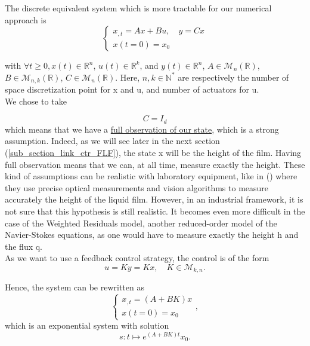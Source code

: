 \documentclass[12pt]{article}
\begin{document}
The discrete equivalent system which is more tractable for our numerical approach is 
\begin{equation}\label{Ctrl_framework_discrete}
    \left\{ 
    \begin{aligned}
        x_{,t} = Ax+Bu, \quad y=Cx\\
        x(t=0) = x_0
    \end{aligned}
    \right.
\end{equation}

with $\forall t\geq 0, x(t)\in \mathbb{R}^n$, $u(t)\in \mathbb{R}^k$, and $y(t) \in \mathbb{R}^n$, $A \in \mathcal{M}_{n}(\mathbb{R})$, $B \in \mathcal{M}_{n, k}(\mathbb{R})$, $C \in \mathcal{M}_{n}(\mathbb{R})$. Here, $n,k \in  \mathbb{N}^*$ are respectively the number of space discretization point for x and u, and number of actuators for u. \\

We chose to take 

\begin{equation}
    C = I_d
\end{equation}
which means that we have a \underline{ full observation of our state}, which is a strong assumption. Indeed, as we will see later in the next section (\ref{sub_section_link_ctr_FLF}), the state x will be the height of the film. Having full observation means that we can, at all time, measure exactly the height. These kind of assumptions can be realistic with laboratory equipment, like in (\cite{experimental_paper}) where they use precise optical measurements and vision algorithms to measure accurately the height of the liquid film. However, in an industrial framework, it is not sure that this hypothesis is still realistic. It becomes even more difficult in the case of the Weighted Residuals model, another reduced-order model of the Navier-Stokes equations, as one would have to measure exactly the height h and the flux q. 
\\

As we want to use a feedback control strategy, the control is of the form 
\begin{equation}
    u = Ky = Kx, \quad K \in \mathcal{M}_{k,n}.
\end{equation}

Hence, the system can be rewritten as 
\begin{equation}\label{expo_ctrl_system}
    \left\{
    \begin{aligned}
        x_{,t}=(A+BK)x \\
        x(t=0) = x_0
    \end{aligned}
    \right.,
\end{equation}
which is an exponential system with solution $$s:t\mapsto  e^{(A+BK)t}x_0.$$
\end{document}
